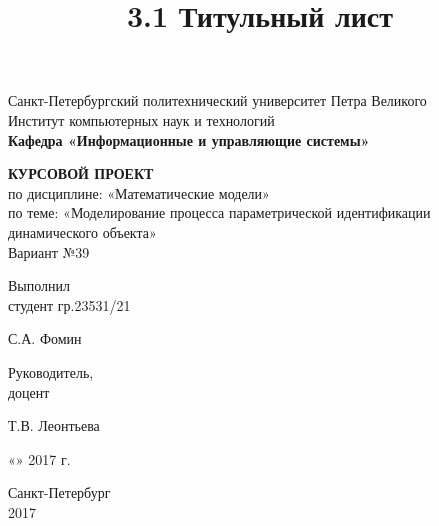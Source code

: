 \documentclass[a4paper, 12pt]{article}
\title{3.1 Титульный лист}
\begin{document}
\thispagestyle{empty}

\begin{center}
    Санкт-Петербургский политехнический университет Петра Великого\\
    Институт компьютерных наук и технологий\\
    \bfseries{Кафедра «Информационные и управляющие системы»}
\end{center}

\vspace{20ex}

\begin{center}
    {
    \LARGE \textbf{КУРСОВОЙ ПРОЕКТ} \\[3ex]
    по дисциплине: «Математические модели» \\
    по теме: «Моделирование процесса параметрической идентификации динамического объекта» \\[3ex]
    Вариант №39
    }
\end{center}

\vspace{40ex}

\noindent Выполнил\\
студент гр.23531/21\hfill
\begin{minipage}{0.7\textwidth}
    \hfill \uline{\hspace{3cm}} \hspace{1.1cm} С.А. Фомин
\end{minipage}

\vspace{3ex}

\noindent Руководитель,\\
доцент\hfill
\begin{minipage}{0.7\textwidth}
    \hfill \uline{\hspace{3cm}} \hspace{0.5cm} Т.В. Леонтьева
\end{minipage}

\vspace{3ex}

\hfill \begin{minipage}{0.6\textwidth} \hfill «\uline{\hspace{1cm}}»\uline{\hspace{3cm}} 2017 г.\end{minipage}

\vfill

\begin{center}
    Санкт-Петербург\\
    2017
\end{center}
\end{document}

